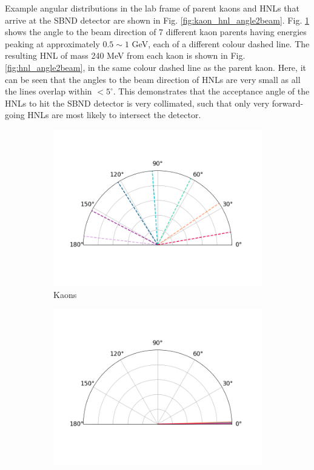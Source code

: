 Example angular distributions in the lab frame of parent kaons and HNLs that arrive at the SBND detector are shown in Fig. \ref{fig:kaon_hnl_angle2beam}.
Fig. \ref{fig:kaon_angle2beam} shows the angle to the beam direction of 7 different kaon parents having energies peaking at approximately $0.5\sim1$ GeV, each of a different colour dashed line.
The resulting HNL of mass 240 MeV from each kaon is shown in Fig. \ref{fig:hnl_angle2beam}, in the same colour dashed line as the parent kaon.
Here, it can be seen that the angles to the beam direction of HNLs are very small as all the lines overlap within $ < 5^\circ$.
This demonstrates that the acceptance angle of the HNLs to hit the SBND detector is very collimated, such that only very forward-going HNLs are most likely to intersect the detector.

\begin{figure}[htbp!]
        \centering
        \begin{subfigure}[b]{0.495\textwidth}
            \centering
            \includegraphics[width=\textwidth]{kaon_angle}
            \caption{Kaons}%
            \label{fig:kaon_angle2beam}
        \end{subfigure}
        \hfill
        \begin{subfigure}[b]{0.495\textwidth}  
            \centering 
            \includegraphics[width=\textwidth]{hnl_angle}

\end{subfigure}
\end{figure}
